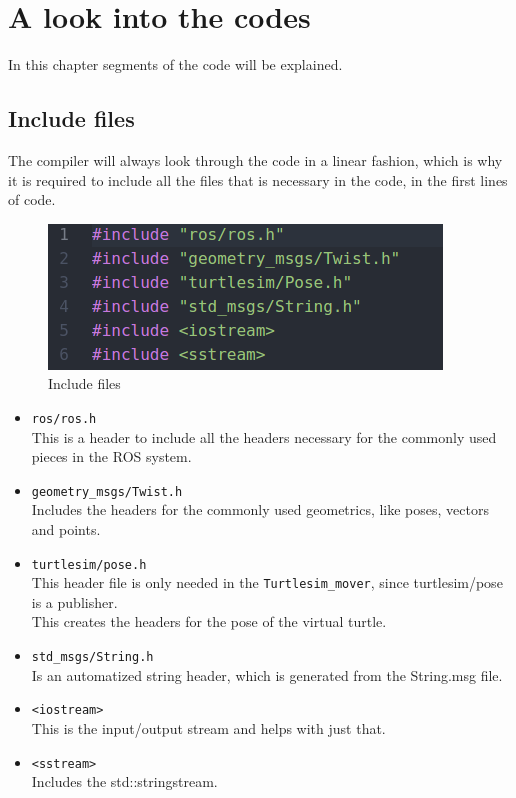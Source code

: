 \chapter{A look into the codes} \label{ch:lookinto}

In this chapter segments of the code will be explained.

\section{Include files} 

The compiler will always look through the code in a linear fashion, which is why it is required to include all the files that is necessary in the code, in the first lines of code.\\

\begin{figure}[h]
\begin{center}
\includegraphics[width=.5\textwidth]{figures/therealinclude.png}
\caption{Include files}
\end{center}
\end{figure}\label{fig:include}

\begin{itemize}
\item \texttt{ros/ros.h}\\
This is a header to include all the headers necessary for the commonly used pieces in the ROS system.\\
\item \texttt{geometry\_msgs/Twist.h}\\
Includes the headers for the commonly used geometrics, like poses, vectors and points.\\
\item \texttt{turtlesim/pose.h}\\
This header file is only needed in the \texttt{Turtlesim\_mover}, since turtlesim/pose is a publisher.\\
This creates the headers for the pose of the virtual turtle.\\
\item \texttt{std\_msgs/String.h}\\
Is an automatized string header, which is generated from the String.msg file.\\
\item \texttt{<iostream>}\\
This is the input/output stream and helps with just that.\\
\item \texttt{<sstream>}\\
Includes the std::stringstream.\\

\end{itemize}


